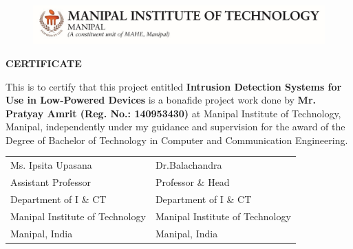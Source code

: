 \begin{figure}[bpht!]
  \begin{center}
	\includegraphics[scale=1]{MITLogo}
	\end{center}
	\end{figure}
\begin{center}
\large{\textbf{CERTIFICATE}}\\
\end{center}


This is to certify that this project entitled \textbf{Intrusion Detection Systems for Use in Low-Powered Devices} is a bonafide project work done by \textbf{Mr. Pratyay Amrit (Reg. No.: 140953430)} at Manipal Institute of Technology, Manipal, independently under my guidance and supervision for the award of the Degree of
Bachelor of Technology in Computer and Communication Engineering.


\vspace{4cm}

\begin{table}[h]
	\centering
		\begin{tabular}{p{3in} p{3in}}
			Ms. Ipsita Upasana &  Dr.Balachandra  \\
			Assistant Professor & Professor \& Head \\
			  Department of I \& CT&  Department of I \& CT \\
			Manipal Institute of Technology  & Manipal Institute of Technology\\
			Manipal, India &  Manipal, India
		\end{tabular}
\end{table}
